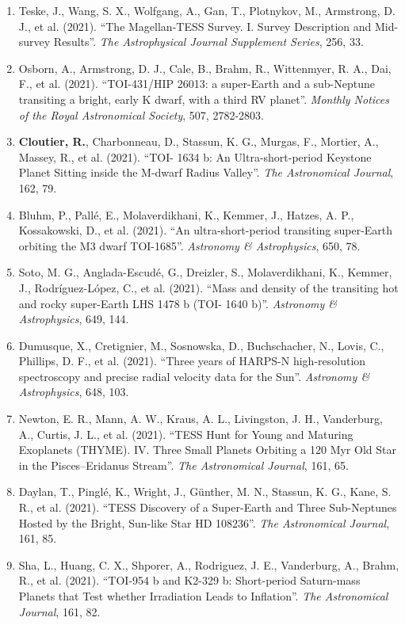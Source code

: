 \documentclass[12pt]{article}
\begin{document}
\begin{itemize}
\begin{enumerate}
\item Teske, J., Wang, S. X., Wolfgang, A., Gan, T., Plotnykov, M., Armstrong, D. J., et al. (2021). ``The Magellan-TESS Survey. I. Survey Description and Mid-survey Results''. {\it The Astrophysical Journal Supplement Series}, 256, 33.
\item Osborn, A., Armstrong, D. J., Cale, B., Brahm, R., Wittenmyer, R. A., Dai, F., et al. (2021). ``TOI-431/HIP 26013: a super-Earth and a sub-Neptune transiting a bright, early K dwarf, with a third RV planet''. {\it Monthly Notices of the Royal Astronomical Society}, 507, 2782-2803.
\item {\bf Cloutier, R.}, Charbonneau, D., Stassun, K. G., Murgas, F., Mortier, A., Massey, R., et al. (2021). ``TOI- 1634 b: An Ultra-short-period Keystone Planet Sitting inside the M-dwarf Radius Valley''. {\it The Astronomical Journal}, 162, 79.
\item Bluhm, P., Pallé, E., Molaverdikhani, K., Kemmer, J., Hatzes, A. P., Kossakowski, D., et al. (2021). ``An ultra-short-period transiting super-Earth orbiting the M3 dwarf TOI-1685''. {\it Astronomy \& Astrophysics}, 650, 78.
\item Soto, M. G., Anglada-Escudé, G., Dreizler, S., Molaverdikhani, K., Kemmer, J., Rodríguez-López, C., et al. (2021). ``Mass and density of the transiting hot and rocky super-Earth LHS 1478 b (TOI- 1640 b)''. {\it Astronomy \& Astrophysics}, 649, 144.
\item Dumusque, X., Cretignier, M., Sosnowska, D., Buchschacher, N., Lovis, C., Phillips, D. F., et al. (2021). ``Three years of HARPS-N high-resolution spectroscopy and precise radial velocity data for the Sun''. {\it Astronomy \& Astrophysics}, 648, 103.
\item Newton, E. R., Mann, A. W., Kraus, A. L., Livingston, J. H., Vanderburg, A., Curtis, J. L., et al. (2021). ``TESS Hunt for Young and Maturing Exoplanets (THYME). IV. Three Small Planets Orbiting a 120 Myr Old Star in the Pisces–Eridanus Stream''. {\it The Astronomical Journal}, 161, 65.
\item Daylan, T., Pinglé, K., Wright, J., Günther, M. N., Stassun, K. G., Kane, S. R., et al. (2021). ``TESS Discovery of a Super-Earth and Three Sub-Neptunes Hosted by the Bright, Sun-like Star HD 108236''. {\it The Astronomical Journal}, 161, 85.
\item Sha, L., Huang, C. X., Shporer, A., Rodriguez, J. E., Vanderburg, A., Brahm, R., et al. (2021). ``TOI-954 b and K2-329 b: Short-period Saturn-mass Planets that Test whether Irradiation Leads to Inflation''. {\it The Astronomical Journal}, 161, 82.

\end{enumerate}
\end{itemize}
\end{document}
